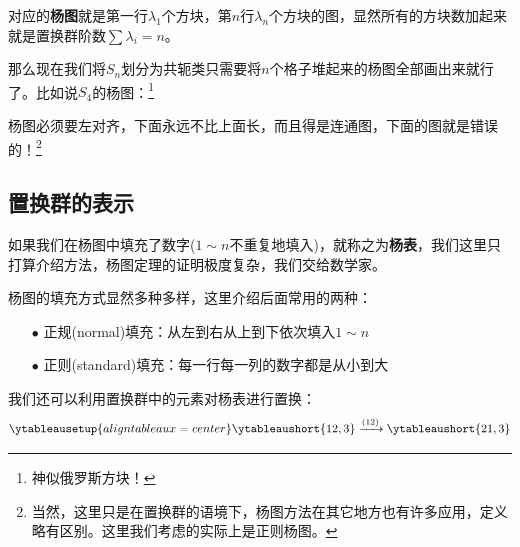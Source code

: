 对应的\textbf{杨图}就是第一行$\lambda_1$个方块，第$n$行$\lambda_n$个方块的图，显然所有的方块数加起来就是置换群阶数$\sum \lambda_i=n$。

那么现在我们将$S_n$划分为共轭类只需要将$n$个格子堆起来的杨图全部画出来就行了。比如说$S_4$的杨图：\footnote{神似俄罗斯方块！}

\begin{center}
\quad\quad{}\quad\quad{}\quad\quad{}\quad\quad{}
\end{center}

杨图必须要左对齐，下面永远不比上面长，而且得是连通图，下面的图就是{\color{red}错误的！}\footnote{当然，这里只是在置换群的语境下，杨图方法在其它地方也有许多应用，定义略有区别。这里我们考虑的实际上是正则杨图。}
\begin{center}
	\qquad{}\qquad{}
\end{center}

\subsection{置换群的表示}
如果我们在杨图中填充了数字($1\sim n$不重复地填入)，就称之为\textbf{杨表}，我们这里只打算介绍方法，杨图定理的证明极度复杂，我们交给数学家。

杨图的填充方式显然多种多样，这里介绍后面常用的两种：
\begin{itemize}
	\item[$\bullet$] 正规(normal)填充：从左到右从上到下依次填入$1\sim n$
	\begin{center}
		\qquad{}\qquad{}
	\end{center}
	\item[$\bullet$] 正则(standard)填充：每一行每一列的数字都是从小到大
	\begin{center}
		\qquad{}\qquad {}\qquad{}
	\end{center}
\end{itemize}

我们还可以利用置换群中的元素对杨表进行置换：
\begin{equation*}
	\ytableausetup{aligntableaux=center}
	\ytableaushort{12,3}\xrightarrow{{(12)}}	\ytableaushort{21,3}
\end{equation*}

